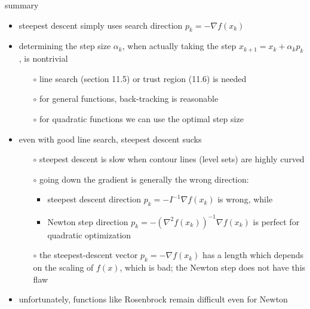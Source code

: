 \documentclass[10pt,hyperref]{beamer}
\newcommand{\grad}{\nabla}
\begin{document}
\begin{frame}{summary}

\begin{itemize}
\item steepest descent simply uses search direction $p_k = -\grad f(x_k)$
\item determining the step size $\alpha_k$, when actually taking the step $x_{k+1}=x_k + \alpha_k p_k$, is nontrivial
    \begin{itemize}
    \item[$\circ$] line search (section 11.5) or trust region (11.6) is needed
    \item[$\circ$] for general functions, back-tracking is reasonable
    \item[$\circ$] for quadratic functions we can use the optimal step size
    \end{itemize}
\item even with good line search, steepest descent sucks
    \begin{itemize}
    \item[$\circ$] steepest descent is slow when contour lines (level sets) are highly curved

    \smallskip
    \item[$\circ$] going down the gradient is generally \alert{the wrong direction}:
        \begin{itemize}
        \item steepest descent direction $p_k = - I^{-1} \grad f(x_k)$ is wrong, while
        \item Newton step direction $p_k = - (\grad^2f(x_k))^{-1} \grad f(x_k)$ is perfect for quadratic optimization
        \end{itemize}
    \item[$\circ$] the steepest-descent vector $p_k = -\grad f(x_k)$ has a length which depends on the scaling of $f(x)$, which is bad; the Newton step does not have this flaw
    \end{itemize}
\item unfortunately, functions like Rosenbrock remain difficult even for Newton
\end{itemize}
\end{frame}
\end{document}
